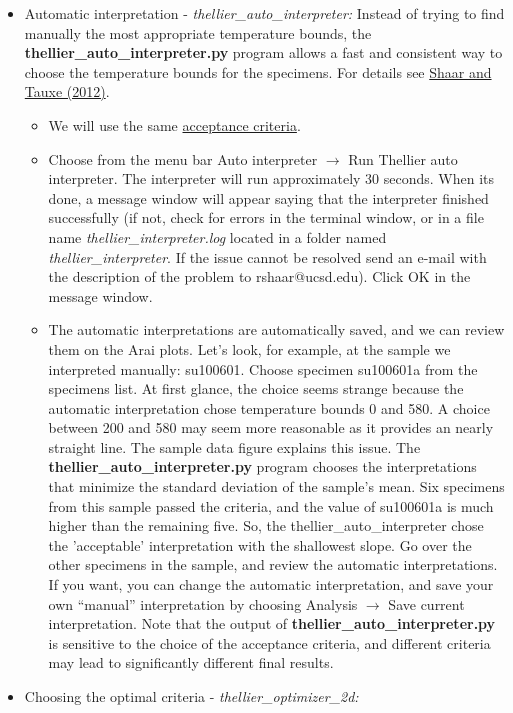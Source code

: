 \documentclass[11pt]{book}
\begin{document}
{{\begin{itemize}
\item{Automatic interpretation - \it{thellier\_auto\_interpreter:}}
Instead of trying to find manually the most appropriate temperature bounds, the  {\bf thellier\_auto\_interpreter.py} program allows a fast and consistent way to choose the temperature bounds for the specimens. For details see \href{http://magician.ucsd.edu/~ltauxe/CV/open/shaar12.pdf}{Shaar and Tauxe (2012)}.  \nocite{shaar12}
\begin{itemize}
\item We will use the same \href{#acceptance_criteria }{acceptance criteria}.
\item Choose from the menu bar Auto interpreter $\rightarrow$ Run Thellier auto interpreter. The interpreter will run approximately 30 seconds. When its done, a message window will appear saying that the interpreter finished successfully (if not, check for errors in the terminal window, or in a file name {\it thellier\_interpreter.log}  located in a folder named {\it thellier\_interpreter}. If the issue cannot be resolved send an e-mail with the description of the problem to rshaar@ucsd.edu). Click OK in the message window.
\item The automatic interpretations are automatically saved, and we can review them on the Arai plots.  Let's look, for example, at the sample we interpreted  manually: su100601. Choose specimen su100601a from the specimens list. At first glance, the choice seems strange because the automatic interpretation chose temperature bounds 0 and 580. A choice between 200 and 580 may seem more reasonable as it provides an nearly straight line. The sample data figure explains this issue. The {\bf thellier\_auto\_interpreter.py} program chooses the interpretations that minimize the standard deviation of the sample's mean. Six specimens from this sample passed the criteria, and the value of su100601a is much higher than the remaining five. So, the thellier\_auto\_interpreter chose the 'acceptable' interpretation with the shallowest  slope. Go over the other specimens in the sample, and review the automatic interpretations. If you want, you can change the automatic interpretation, and save your own ``manual'' interpretation by choosing Analysis $\rightarrow$ Save current interpretation. Note that the output of {\bf thellier\_auto\_interpreter.py} is sensitive to the choice of the acceptance criteria, and different criteria may lead to significantly different final results. 
\end{itemize}
\item{Choosing the optimal criteria - \it{thellier\_optimizer\_2d:}}

\end{itemize}}}
\end{document}
